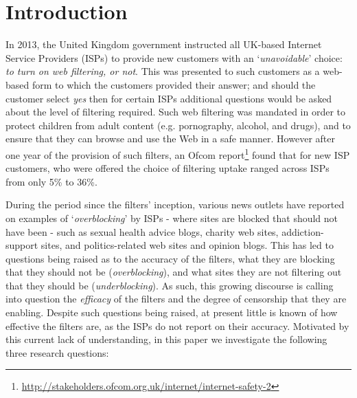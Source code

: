 \documentclass{bmcart}
\begin{document}

\section*{Introduction}


In 2013, the United Kingdom government instructed all UK-based Internet Service Providers (ISPs) to provide new customers with an `\textit{unavoidable}' choice: \textit{to turn on web filtering, or not}. 
This was presented to such customers as a web-based form to which the customers provided their answer; and should the customer select \textit{yes} then for certain ISPs additional questions would be asked about the level of filtering required.
Such web filtering was mandated in order to protect children from adult content (e.g. pornography, alcohol, and drugs), and to ensure that they can browse and use the Web in a safe manner.
However after one year of the provision of such filters, an Ofcom report\footnote{\url{http://stakeholders.ofcom.org.uk/internet/internet-safety-2}} found that for new ISP customers, who were offered the choice of filtering uptake ranged across ISPs from only 5\% to 36\%.

During the period since the filters' inception, various news outlets have reported on examples of `\textit{overblocking}' by ISPs - where sites are blocked that should not have been - such as sexual health advice blogs, charity web sites, addiction-support sites, and politics-related web sites and opinion blogs.
This has led to questions being raised as to the accuracy of the filters, what they are blocking that they should not be (\textit{overblocking}), and what sites they are not filtering out that they should be (\textit{underblocking}).
As such, this growing discourse is  calling into question the \textit{efficacy} of the filters and the degree of censorship that they are enabling.
Despite such questions being raised, at present little is known of how effective the filters are, as the ISPs do not report on their accuracy.
Motivated by this current lack of understanding, in this paper we investigate the following three research questions:
\end{document}
